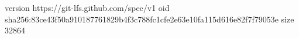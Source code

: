 version https://git-lfs.github.com/spec/v1
oid sha256:83ce43f50a910187761829b4f3c788fc1cfe2e63e10fa115d616e82f7f79053e
size 32864
